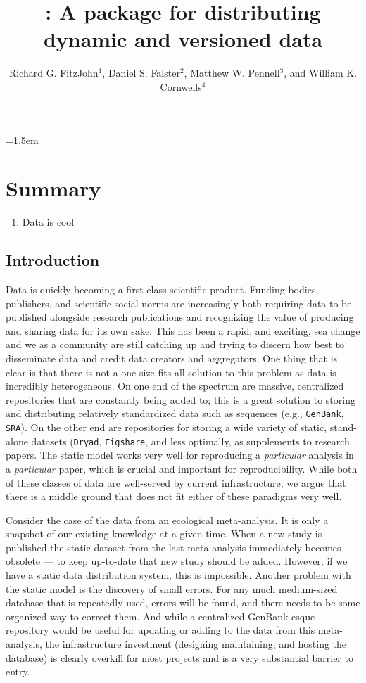 \documentclass[a4paper,11pt]{article}
\title{{\datastorr}: A package for distributing dynamic and versioned
data}
\author{Richard G. FitzJohn$^1$, Daniel S. Falster$^2$, Matthew
  W. Pennell$^3$, and William K. Cornwells$^4$}
\affiliation{
$^1$ Somewhere in the UK\\
$^2$ Everywhere else\\
$^3$ Department of Zoology and Biodiversity Research Centre,
University of British Columbia, Vancouver, B.C. V6T 1Z4 Canada\\

}
\date{}
\begin{document}
\mstitlepage
\noindent
\parindent=1.5em
\addtolength{\parskip}{.3em}
\doublespacing
\linenumbers
\section{Summary}
\begin{enumerate}
\def\labelenumi{\arabic{enumi}.}
\itemsep1pt\parskip0pt
\item Data is cool
\end{enumerate}

\subsection{Introduction}

Data is quickly becoming a first-class scientific product. Funding bodies, publishers, and scientific social norms are increasingly both requiring data to be published alongside research publications and recognizing the value of producing and sharing data for its own sake. This has been a rapid, and exciting, sea change and we as a community are still catching up and trying to discern how best to disseminate data and credit data creators and aggregators. One thing that is clear is that there is not a one-size-fits-all solution to this problem as data is incredibly heterogeneous. On one end of the spectrum are massive, centralized repositories that are constantly being added to; this is a great solution to storing and distributing relatively standardized data such as sequences (e.g., \texttt{GenBank}, \texttt{SRA}). On the other end are repositories for storing a wide variety of static, stand-alone datasets (\texttt{Dryad}, \texttt{Figshare}, and less optimally, as supplements to research papers. The static model works very well for reproducing a \emph{particular} analysis in a \emph{particular} paper, which is crucial and important for reproducibility. While both of these classes of data are well-served by current infrastructure, we argue that there is a middle ground that does not fit either of these paradigms very well.

Consider the case of the data from an ecological meta-analysis. It is only a snapshot of our existing knowledge at a given time. When a new study is published the static dataset from the last meta-analysis immediately becomes obsolete --- to keep up-to-date that new study should be added. However, if we have a static data distribution system, this is impossible. Another problem with the static model is the discovery of small errors. For any much medium-sized database that is repeatedly used, errors will be found, and there needs to be some organized way to correct them. And while a centralized GenBank-esque repository would be useful for updating or adding to the data from this meta-analysis, the infrastructure investment (designing maintaining, and hosting the database) is clearly overkill for most projects and is a very substantial barrier to entry.
\end{document}

